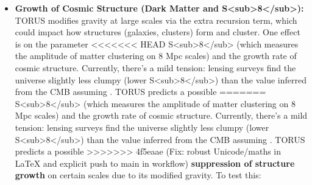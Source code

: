 \documentclass[]{article}
\begin{document}
\begin{itemize}
\begin{itemize}
  \end{itemize}
\item
  \textbf{Growth of Cosmic Structure (Dark Matter and
  S\textless{}sub\textgreater{}8\textless{}/sub\textgreater{}):} TORUS
  modifies gravity at large scales via the extra recursion term, which
  could impact how structures (galaxies, clusters) form and cluster. One
  effect is on the parameter
<<<<<<< HEAD
  S\textless sub\textgreater8\textless/sub\textgreater{} (which measures
  the amplitude of matter clustering on 8 Mpc scales) and the growth
  rate of cosmic structure. Currently, there's a mild tension: lensing
  surveys find the universe slightly less clumpy (lower
  S\textless sub\textgreater8\textless/sub\textgreater) than the value
  inferred from the CMB assuming \LambdaCDM. TORUS predicts a possible
=======
  S\textless{}sub\textgreater{}8\textless{}/sub\textgreater{} (which
  measures the amplitude of matter clustering on 8 Mpc scales) and the
  growth rate of cosmic structure. Currently, there's a mild tension:
  lensing surveys find the universe slightly less clumpy (lower
  S\textless{}sub\textgreater{}8\textless{}/sub\textgreater{}) than the
  value inferred from the CMB assuming \LambdaCDM. TORUS predicts a possible
>>>>>>> 4f5eaae (Fix: robust Unicode/maths in LaTeX and explicit push to main in workflow)
  \textbf{suppression of structure growth} on certain scales due to its
  modified gravity​. To test this:


\end{itemize}
\end{document}
